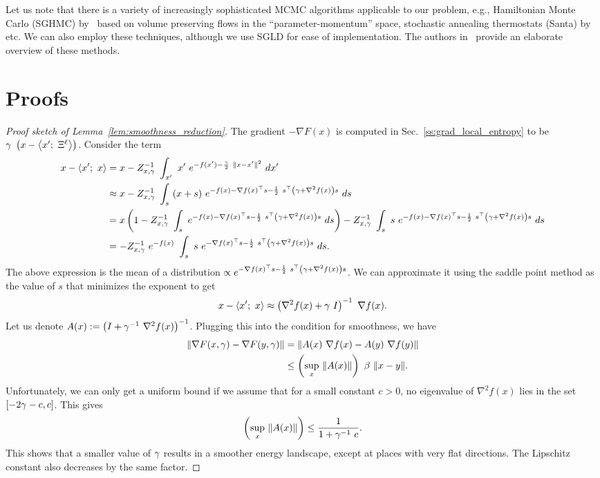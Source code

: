 \documentclass[10pt]{article}
\newcommand{\minibatch}[1]{\Xi^{#1}}
\begin{document}
\begin{appendices}
Let us note that there is a variety of increasingly sophisticated MCMC algorithms applicable to our problem, e.g., Hamiltonian Monte Carlo (SGHMC) by~\citet{chen2014stochastic} based on volume preserving flows in the ``parameter-momentum'' space, stochastic annealing thermostats (Santa) by~\citet{chen2015bridging} etc. We can also employ these techniques, although we use SGLD for ease of implementation. The authors in~\citet{ma2015complete} provide an elaborate overview of these methods.

\section{Proofs}
\label{s:app:proofs}

\begin{proof}[Proof sketch of Lemma~\ref{lem:smoothness_reduction}]
The gradient $-\nabla F(x)$ is computed in Sec.~\ref{ss:grad_local_entropy} to be $\g\ \rbrac{x - \ag{x';\ \minibatch{\ell}}}$. Consider the term
\begin{align*}
    x - \ag{x';\ x}
    &= x - Z_{x,\g}^{-1}\ \int_{x'}\ x'\ e^{-f(x') - \f{\g}{2}\ \norm{x-x'}^2}\ dx'\\
    &\approx x - Z_{x,\g}^{-1}\ \int_{s}\ (x + s)\ e^{-f(x) - \nabla f(x)^\top s - \f{1}{2}\ s^\top \rbrac{\g + \nabla^2 f(x)} s}\ ds\\
    &= x\rbrac{1 -  Z_{x,\g}^{-1}\ \int_{s}\ e^{-f(x) - \nabla f(x)^\top s - \f{1}{2}\ s^\top \rbrac{\g + \nabla^2 f(x)} s}\ ds} - Z_{x,\g}^{-1}\ \int_{s}\ s\ e^{-f(x) - \nabla f(x)^\top s - \f{1}{2}\ s^\top \rbrac{\g + \nabla^2 f(x)} s}\ ds\\
    &= -Z_{x,\g}^{-1}\ e^{-f(x)}\ \int_{s}\ s\ e^{-\nabla f(x)^\top s - \f{1}{2}\ s^\top \rbrac{\g + \nabla^2 f(x)} s}\ ds.
\end{align*}
The above expression is the mean of a distribution $\propto e^{-\nabla f(x)^\top s - \frac{1}{2}\ s^\top \left(\gamma + \nabla^2 f(x)\right) s}$. We can approximate it using the saddle point method as the value of $s$ that minimizes the exponent to get
$$
    x - \left\langle x';\ x\right\rangle \approx \left(\nabla^2 f(x) + \gamma\ I\right)^{-1}\ \nabla f(x).
$$
Let us denote $A(x) := \left(I + \gamma^{-1}\ \nabla^2 f(x)\right)^{-1}$. Plugging this into the condition for smoothness, we have
\begin{align*}
    \lVert\nabla F(x, \gamma) - \nabla F(y, \gamma)\rVert
    &= \lVert A(x)\ \nabla f(x) - A(y)\ \nabla f(y)\rVert\\
    &\leq \left(\sup_x\ \lVert A(x)\rVert\right)\ \beta\ \lVert x-y\rVert.
\end{align*}
Unfortunately, we can only get a uniform bound if we assume that for a small constant $c > 0$, no eigenvalue of $\nabla^2 f(x)$ lies in the set $[-2 \gamma -c, c]$. This gives
$$
    \left(\sup_x\ \lVert A(x)\rVert\right) \leq \frac{1}{1+\gamma^{-1}\ c}.
$$
This shows that a smaller value of $\gamma$ results in a smoother energy landscape, except at places with very flat directions. The Lipschitz constant also decreases by the same factor.
\end{proof}


\end{appendices}
\end{document}
